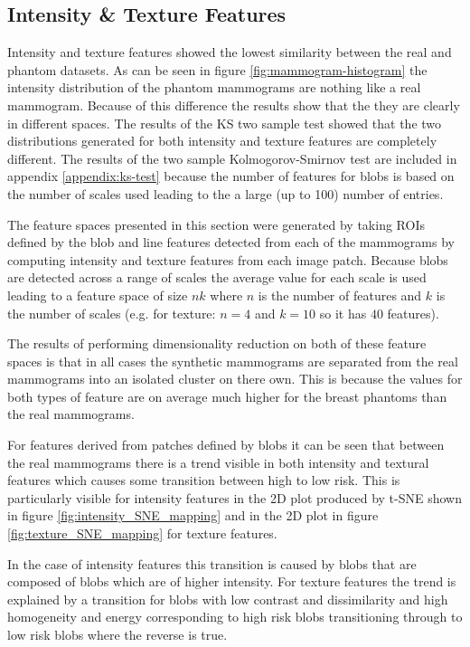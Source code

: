 \subsection{Intensity \& Texture Features}
\label{subsec:results-texture}
Intensity and texture features showed the lowest similarity between the real and phantom datasets. As can be seen in figure \ref{fig:mammogram-histogram} the intensity distribution of the phantom mammograms are nothing like a real mammogram. Because of this difference the results show that the they are clearly in different spaces. The results of the KS two sample test showed that the two distributions generated for both intensity and texture features are completely different. The results of the two sample Kolmogorov-Smirnov test are included in appendix \ref{appendix:ks-test} because the number of features for blobs is based on the number of scales used leading to the a large (up to 100) number of entries. 

The feature spaces presented in this section were generated by taking ROIs defined by the blob and line features detected from each of the mammograms by computing intensity and texture features from each image patch. Because blobs are detected across a range of scales the average value for each scale is used leading to a feature space of size $nk$ where $n$ is the number of features and $k$ is the number of scales (e.g. for texture: $n = 4$ and $k = 10$ so it has $40$ features). 

The results of performing dimensionality reduction on both of these feature spaces is that in all cases the synthetic mammograms are separated from the real mammograms into an isolated cluster on there own. This is because the values for both types of feature are on average much higher for the breast phantoms than the real mammograms.

For features derived from patches defined by blobs it can be seen that between the real mammograms there is a trend visible in both intensity and textural features which causes some transition between high to low risk. This is particularly visible for intensity features in the 2D plot produced by t-SNE shown in figure \ref{fig:intensity_SNE_mapping} and in the 2D plot in figure \ref{fig:texture_SNE_mapping} for texture features. 

In the case of intensity features this transition is caused by blobs that are composed of blobs which are of higher intensity. For texture features the trend is explained by a transition for blobs with low contrast and dissimilarity and high homogeneity and energy corresponding to high risk blobs transitioning through to low risk blobs where the reverse is true.

